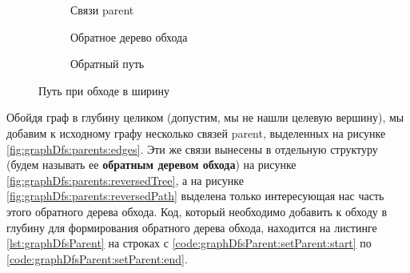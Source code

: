 \documentclass[../../article.tex]{subfiles}
\begin{document}
\begin{figure*}
    \centering
    \begin{subfigure}{0.32\textwidth}
        \caption{Связи {\firacodebold parent}}
        \label{fig:graphBfs:parents:edges}
    \end{subfigure}
    \begin{subfigure}{0.32\textwidth}
        \caption{Обратное дерево обхода}
        \label{fig:graphBfs:parents:reversedTree}
    \end{subfigure}
    \begin{subfigure}{0.32\textwidth}
        \caption{Обратный путь}
        \label{fig:graphBfs:parents:reversedPath}
    \end{subfigure}
    \caption{Путь при обходе в ширину}
    \label{fig:graphBfs:parents}
\end{figure*}

Обойдя граф в глубину целиком (допустим, мы не нашли целевую вершину), мы добавим к исходному графу несколько связей {\firacodebold parent}, выделенных на рисунке \ref{fig:graphDfs:parents:edges}. Эти же связи вынесены в отдельную структуру (будем называть ее {\bfseries обратным деревом обхода}) на рисунке \ref{fig:graphDfs:parents:reversedTree}, а на рисунке \ref{fig:graphDfs:parents:reversedPath} выделена только интересующая нас часть этого обратного дерева обхода. Код, который необходимо добавить к обходу в глубину для формирования обратного дерева обхода, находится на листинге \ref{lst:graphDfsParent} на строках с \ref{code:graphDfsParent:setParent:start} по \ref{code:graphDfsParent:setParent:end}.
\end{document}
